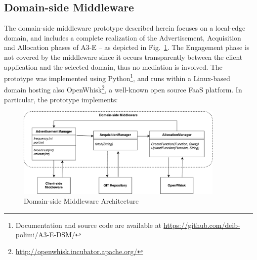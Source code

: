 \subsection{Domain-side Middleware}

The domain-side middleware prototype described herein focuses on a local-edge domain, and includes a complete realization of the Advertisement, Acquisition and Allocation phases of A3-E -- as depicted in Fig.~\ref{fig:domain-prototype}. The Engagement phase is not covered by the middleware since it occurs transparently between the client application and the selected domain, thus no mediation is involved. The prototype was implemented using Python\footnote{Documentation and source code are available at \url{https://github.com/deib-polimi/A3-E-DSM/}}, and runs within a Linux-based domain hosting also OpenWhisk\footnote{\url{http://openwhisk.incubator.apache.org/}}, a well-known open source FaaS platform. In particular, the prototype implements:

\begin{figure}[tbp]
	\includegraphics[width=0.9\textwidth]{figs/domain-side-middleware}
	\caption{Domain-side Middleware Architecture}
	\label{fig:domain-prototype}
\end{figure}

